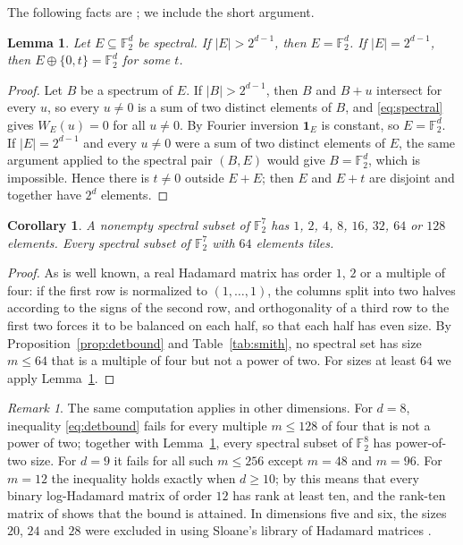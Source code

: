 \documentclass[11pt]{amsart}
\newtheorem{lemma}[theorem]{Lemma}
\newtheorem{corollary}[theorem]{Corollary}
\theoremstyle{definition}
\theoremstyle{remark}
\newtheorem{remark}[theorem]{Remark}
\numberwithin{equation}{section}
\numberwithin{table}{section}
\newcommand{\F}{\mathbb{F}}
\newcommand{\one}{\mathbf{1}}
\begin{document}
The following facts are \cite[Corollary~4.5 and Proposition~6.4]{AAB17}; we include the short argument.

\begin{lemma}\label{lem:half}
Let $E\subseteq\F_2^d$ be spectral. If $|E|>2^{d-1}$, then $E=\F_2^d$. If $|E|=2^{d-1}$, then $E\oplus\{0,t\}=\F_2^d$ for some $t$.
\end{lemma}

\begin{proof}
Let $B$ be a spectrum of $E$. If $|B|>2^{d-1}$, then $B$ and $B+u$ intersect for every $u$, so every $u\ne0$ is a sum of two distinct elements of $B$, and \eqref{eq:spectral} gives $W_E(u)=0$ for all $u\ne0$. By Fourier inversion $\one_E$ is constant, so $E=\F_2^d$. If $|E|=2^{d-1}$ and every $u\ne0$ were a sum of two distinct elements of $E$, the same argument applied to the spectral pair $(B,E)$ would give $B=\F_2^d$, which is impossible. Hence there is $t\ne0$ outside $E+E$; then $E$ and $E+t$ are disjoint and together have $2^d$ elements.
\end{proof}

\begin{corollary}\label{cor:cardinality}
A nonempty spectral subset of $\F_2^7$ has $1$, $2$, $4$, $8$, $16$, $32$, $64$ or $128$ elements. Every spectral subset of $\F_2^7$ with $64$ elements tiles.
\end{corollary}

\begin{proof}
As is well known, a real Hadamard matrix has order $1$, $2$ or a multiple of four: if the first row is normalized to $(1,\dots,1)$, the columns split into two halves according to the signs of the second row, and orthogonality of a third row to the first two forces it to be balanced on each half, so that each half has even size. By Proposition~\ref{prop:detbound} and Table~\ref{tab:smith}, no spectral set has size $m\le64$ that is a multiple of four but not a power of two. For sizes at least $64$ we apply Lemma~\ref{lem:half}.
\end{proof}

\begin{remark}\label{rem:smith-other}
The same computation applies in other dimensions. For $d=8$, inequality \eqref{eq:detbound} fails for every multiple $m\le128$ of four that is not a power of two; together with Lemma~\ref{lem:half}, every spectral subset of $\F_2^8$ has power-of-two size. For $d=9$ it fails for all such $m\le256$ except $m=48$ and $m=96$. For $m=12$ the inequality holds exactly when $d\ge10$; by \cite[Theorem~4.7]{AAB17} this means that every binary log-Hadamard matrix of order $12$ has rank at least ten, and the rank-ten matrix of \cite[Section~5]{FS20} shows that the bound is attained. In dimensions five and six, the sizes $20$, $24$ and $28$ were excluded in \cite{FS19add} using Sloane's library of Hadamard matrices \cite{Slo}.
\end{remark}
\end{document}
